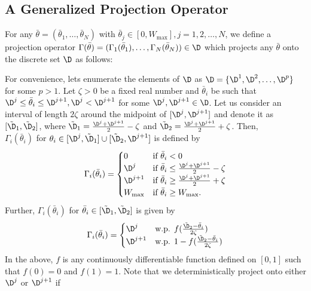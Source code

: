 \documentclass[11pt,letterpaper,english]{article}
\begin{document}
\subsection{A Generalized Projection Operator}
\label{sec:gammaproj}
For any $\bar\theta = (\bar\theta_1,\ldots,\bar\theta_N)$ with $\bar\theta_j \in
[0, W_{\max}], j = 1,2,\ldots,N$, we define a projection operator
$\Gamma(\bar\theta) = (\Gamma_1(\bar\theta_1),\ldots,\Gamma_N(\bar\theta_N)) \in
\D$ which projects any $\bar\theta$ onto the discrete set $\D$ as follows:

For convenience, lets enumerate the elements of $\D$ as
$\D = \{\D^1,\D^2,\ldots,\D^p\}$ for some $p>1$.
Let $\zeta >0$ be a fixed real number and $\bar\theta_i$ be such that $\D^j \le
\bar\theta_i \le \D^{j+1}, \D^j < \D^{j+1}$ for some $\D^j, \D^{j+1} \in \D$.
Let us consider an interval of length $2 \zeta$ around the midpoint of $[\D^j,
\D^{j+1}]$ and denote it as $[\tilde \D_1, \tilde \D_2]$, where $\tilde \D_1 =
\frac{\D^j+\D^{j+1}}{2} - \zeta$ and $\tilde \D_2 = \frac{\D^j+\D^{j+1}}{2} +
\zeta$.
 Then, \\$\Gamma_i(\bar\theta_i)$ for $\theta_i \in [\D^j,\tilde\D_1] \cup
[\tilde\D_2,\D^{j+1}]$ is defined by
\begin{equation}
 \Gamma_i(\bar\theta_i) =
  \begin{cases}
   0 &  \text{if } \bar\theta_i < 0 \\
   \D^j & \text{if } \bar\theta_i \le \frac{\D^j+\D^{j+1}}{2} - \zeta  \\
   \D^{j+1} & \text{if } \bar\theta_i \ge \frac{\D^j+\D^{j+1}}{2} + \zeta \\
   W_{\max} & \text{if } \bar\theta_i \ge W_{\max}.
  \end{cases}
\end{equation}
Further, $\Gamma_i(\bar\theta_i)$ for $\bar{\theta}_i \in [\tilde\D_1,\tilde\D_2]$ is
given by
\begin{equation}
 \Gamma_i(\bar\theta_i) =
  \begin{cases}
   \D^j & \text{w.p. } f(\frac{\tilde\D_2 - \bar\theta_i}{2\zeta})   \\
   \D^{j+1} & \text{w.p. } 1- f(\frac{\tilde\D_2 - \bar\theta_i}{2\zeta}) \\
  \end{cases}
\end{equation}
In the above, $f$ is any continuously
differentiable function defined on $[0,1]$ such that $f(0)=0$ and $f(1)=1$. Note
that we deterministically project onto either $\D^j$ or $\D^{j+1}$ if
\end{document}
